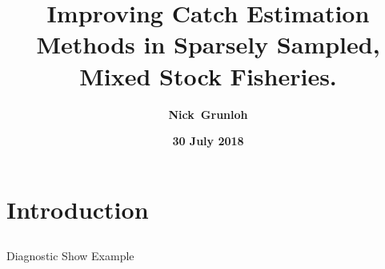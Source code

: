 \documentclass[ xcolor = pdftex, dvipsnames, table ]{beamer}
\begin{document}
%

\title{\textbf{Improving Catch Estimation Methods in Sparsely Sampled, Mixed Stock Fisheries.}}

\author{
\textbf{\mbox{Nick Grunloh}}
}


\date{
\textbf{30 July 2018}
}

%
%

%
\section{Introduction}
\subsection{}
\begin{frame}
        \maketitle
\end{frame}

%
%

\begin{frame}{Diagnostic}
	Show Example
\end{frame}

%
%

\end{document}
